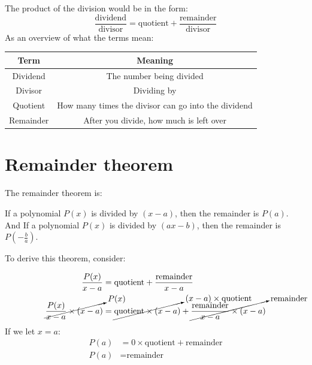 \documentclass{book}
\begin{document}
The product of the division would be in the form:
\[
	\frac{\text{dividend}}{\text{divisor}} = \text{quotient} + \frac{\text{remainder}}{\text{divisor}}
\]
As an overview of what the terms mean:
\begin{center}
	\begin{tabular}{c|c}
		Term      & Meaning                                             \\ \hline
		Dividend  & The number being divided                            \\
		Divisor   & Dividing by                                         \\
		Quotient  & How many times the divisor can go into the dividend \\
		Remainder & After you divide, how much is left over
	\end{tabular}
\end{center}

\section{Remainder theorem}
The remainder theorem is:
\begin{center}
	If a polynomial $P(x)$ is divided by $(x - a)$, then the remainder is $P(a)$.\\
	And If a polynomial $P(x)$ is divided by $(ax - b)$, then the remainder is $P(-\frac{b}{a})$.
\end{center}

To derive this theorem, consider:
\begin{center}
	\begin{align*}
		\frac{P(x)}{x - a}                                 & = \text{quotient} + \frac{\text{remainder}}{x - a}                                                                                                       \\
		\cancelto{P(x)}{\frac{P(x)}{x - a} \times (x - a)} & = \cancelto{(x - a) \times \text{quotient}}{\text{quotient} \times (x - a)} + \cancelto{\text{remainder}}{\frac{\text{remainder}}{x - a} \times (x - a)}
	\end{align*}
	If we let $x = a$:
	\begin{align*}
		P(a) & = 0 \times \text{quotient} + \text{remainder} \\
		P(a) & = \text{remainder}
	\end{align*}
\end{center}
\end{document}
